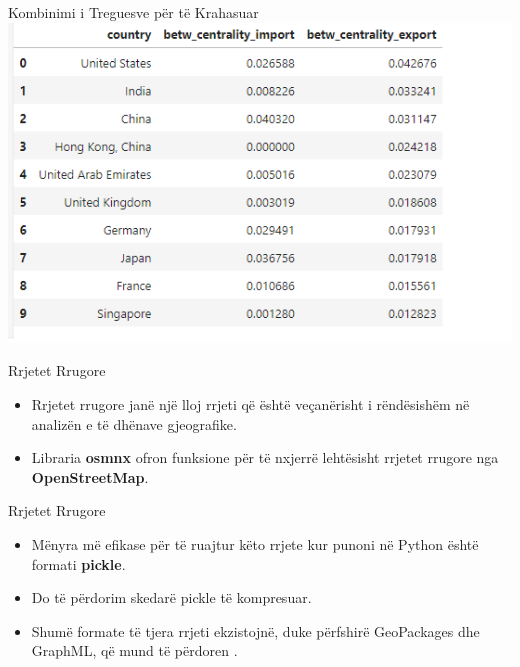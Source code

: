 \documentclass[
  ignorenonframetext,
]{beamer}
\begin{document}
\begin{frame}{Kombinimi i Treguesve për të Krahasuar}
\protect\hypertarget{kombinimi-i-treguesve-puxebr-tuxeb-krahasuar-1}{}
\includegraphics{./Figs/qnyje2.png}
\end{frame}

\begin{frame}{Rrjetet Rrugore}
\protect\hypertarget{rrjetet-rrugore}{}
\begin{itemize}
\item
  Rrjetet rrugore janë një lloj rrjeti që është veçanërisht i
  rëndësishëm në analizën e të dhënave gjeografike.
\item
  Libraria \textbf{osmnx} ofron funksione për të nxjerrë lehtësisht
  rrjetet rrugore nga \textbf{OpenStreetMap}.
\end{itemize}
\end{frame}

\begin{frame}{Rrjetet Rrugore}
\protect\hypertarget{rrjetet-rrugore-1}{}
\begin{itemize}
\item
  Mënyra më efikase për të ruajtur këto rrjete kur punoni në Python
  është formati \textbf{pickle}.
\item
  Do të përdorim skedarë pickle të kompresuar.
\item
  Shumë formate të tjera rrjeti ekzistojnë, duke përfshirë GeoPackages
  dhe GraphML, që mund të përdoren .
\end{itemize}
\end{frame}
\end{document}
